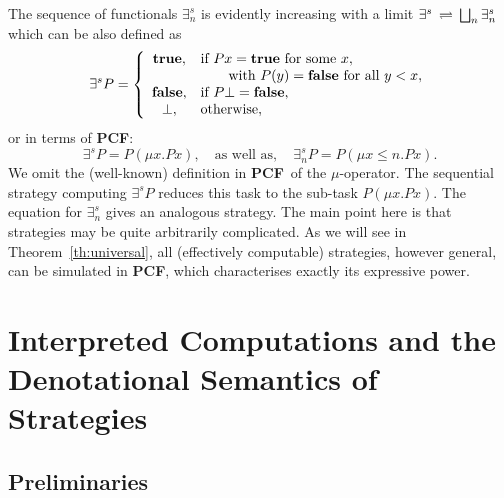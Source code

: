 \documentclass[fleqn]{LMCS}
\theoremstyle{plain}\newtheorem{satz}[thm]{Satz}
\theoremstyle{plain}\newtheorem{hyp}[thm]{Hypothesis}
\theoremstyle{plain}\newtheorem{hyps}[thm]{Hypotheses}
\theoremstyle{definition}\newtheorem{note}[thm]{Note}
\newcommand{\bYdef}{\mathrel{\BYDEF}}
\newcommand{\BYDEF}{\mbox{$\hspace{.2em}\rightleftharpoons\hspace{.2em}$}}
\newcommand{\PCF}{\mbox{\bf PCF}}
\newcommand{\Undef}{{\perp}}
\newcommand{\?}{\mbox{?}}
\newcommand{\false}{\mbox{\bf false}}
\newcommand{\true}{\mbox{\bf true}}
\begin{document}
The sequence of functionals $\exists_n^s$ is evidently increasing with a limit 
$\exists^s\bYdef\bigsqcup_n\exists_n^s$ which can be also defined as 
\[
\exists^s  P = \left\{
			\begin{array}{cl}
			\true, & \mbox{if } Px=\true\mbox{ for some }x,\\
				 & \quad\quad\mbox{with }P(y)=\false
						\mbox{ for all }y<x,\\
			\false, & \mbox{if } P\Undef=\false, \\
			\Undef, & \mbox{otherwise},
			\end {array}
		  \right.
\]
or in terms of \PCF:
\[
\exists^s P=P(\mu x.Px),\quad\mbox{as well as},\quad
\exists_n^s P=P(\mu x\le n.Px).  
\]
We omit the (well-known) definition in \PCF\ of the 
$\mu$-operator. 
The sequential strategy computing $\exists^s P$ reduces this task 
to the sub-task $P(\mu x.Px)$. The equation for $\exists_n^s$ 
gives an analogous strategy. 
The main point here is that strategies may be quite arbitrarily complicated. 
As we will 
see in Theorem~\ref{th:universal}, all (effectively computable) strategies, 
however general, can be simulated in \PCF, which 
characterises exactly its expressive power. 

\section{Interpreted Computations and the Denotational 
Semantics of Strategies}
\label{sec-seq-stra-den-sem}

\subsection{Preliminaries}
\label{sec-seq-stra-den-sem-prelim}
\end{document}
